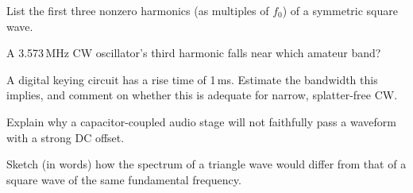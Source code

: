 \begin{practiceproblems}
\item List the first three nonzero harmonics (as multiples of $f_0$) of a
symmetric square wave.
\item A 3.573\,MHz CW oscillator's third harmonic falls near which
amateur band?
\item A digital keying circuit has a rise time of 1\,ms. Estimate the
bandwidth this implies, and comment on whether this is adequate for
narrow, splatter-free CW.
\item Explain why a capacitor-coupled audio stage will not faithfully
pass a waveform with a strong DC offset.
\item Sketch (in words) how the spectrum of a triangle wave would differ
from that of a square wave of the same fundamental frequency.
\end{practiceproblems}

